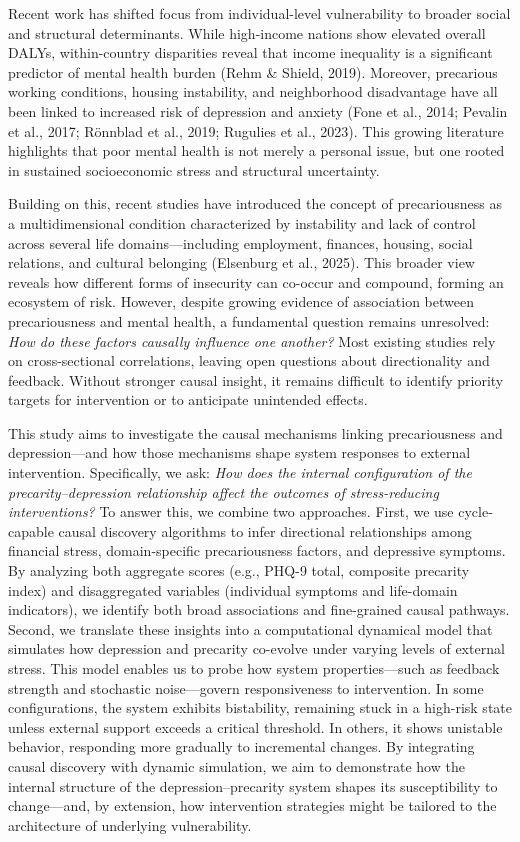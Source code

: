 \documentclass[
]{article}
\begin{document}
Recent work has shifted focus from individual-level vulnerability to
broader social and structural determinants. While high-income nations
show elevated overall DALYs, within-country disparities reveal that
income inequality is a significant predictor of mental health burden
(Rehm \& Shield, 2019). Moreover, precarious working conditions, housing
instability, and neighborhood disadvantage have all been linked to
increased risk of depression and anxiety (Fone et al., 2014; Pevalin et
al., 2017; Rönnblad et al., 2019; Rugulies et al., 2023). This growing
literature highlights that poor mental health is not merely a personal
issue, but one rooted in sustained socioeconomic stress and structural
uncertainty.

Building on this, recent studies have introduced the concept of
precariousness as a multidimensional condition characterized by
instability and lack of control across several life domains---including
employment, finances, housing, social relations, and cultural belonging
(Elsenburg et al., 2025). This broader view reveals how different forms
of insecurity can co-occur and compound, forming an ecosystem of risk.
However, despite growing evidence of association between precariousness
and mental health, a fundamental question remains unresolved: \emph{How
do these factors causally influence one another?} Most existing studies
rely on cross-sectional correlations, leaving open questions about
directionality and feedback. Without stronger causal insight, it remains
difficult to identify priority targets for intervention or to anticipate
unintended effects.

This study aims to investigate the causal mechanisms linking
precariousness and depression---and how those mechanisms shape system
responses to external intervention. Specifically, we ask: \emph{How does
the internal configuration of the precarity--depression relationship
affect the outcomes of stress-reducing interventions?} To answer this,
we combine two approaches. First, we use cycle-capable causal discovery
algorithms to infer directional relationships among financial stress,
domain-specific precariousness factors, and depressive symptoms. By
analyzing both aggregate scores (e.g., PHQ-9 total, composite precarity
index) and disaggregated variables (individual symptoms and life-domain
indicators), we identify both broad associations and fine-grained causal
pathways. Second, we translate these insights into a computational
dynamical model that simulates how depression and precarity co-evolve
under varying levels of external stress. This model enables us to probe
how system properties---such as feedback strength and stochastic
noise---govern responsiveness to intervention. In some configurations,
the system exhibits bistability, remaining stuck in a high-risk state
unless external support exceeds a critical threshold. In others, it
shows unistable behavior, responding more gradually to incremental
changes. By integrating causal discovery with dynamic simulation, we aim
to demonstrate how the internal structure of the depression--precarity
system shapes its susceptibility to change---and, by extension, how
intervention strategies might be tailored to the architecture of
underlying vulnerability.
\end{document}
